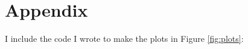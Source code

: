 \documentclass[10pt]{article}
\begin{document}
\newpage
\section{Appendix}
I include the code I wrote to make the plots in Figure \ref{fig:plots}:





\newpage
%



\end{document}
